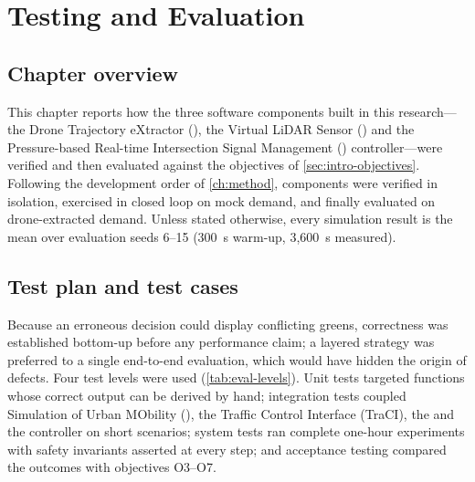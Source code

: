 \chapter{Testing and Evaluation}\label{ch:eval}

\section{Chapter overview}

This chapter reports how the three software components built in this research---the Drone Trajectory eXtractor (\dtx{}), the Virtual LiDAR Sensor (\vls{}) and the Pressure-based Real-time Intersection Signal Management (\prism{}) controller---were verified and then evaluated against the objectives of \cref{sec:intro-objectives}. Following the development order of \cref{ch:method}, components were verified in isolation, exercised in closed loop on mock demand, and finally evaluated on drone-extracted demand. Unless stated otherwise, every simulation result is the mean over evaluation seeds 6--15 (300~s warm-up, 3,600~s measured).

\section{Test plan and test cases}\label{sec:eval-plan}

Because an erroneous \prism{} decision could display conflicting greens, correctness was established bottom-up before any performance claim; a layered strategy was preferred to a single end-to-end evaluation, which would have hidden the origin of defects. Four test levels were used (\cref{tab:eval-levels}). Unit tests targeted functions whose correct output can be derived by hand; integration tests coupled Simulation of Urban MObility (\sumo{}), the Traffic Control Interface (TraCI), the \vls{} and the controller on short scenarios; system tests ran complete one-hour experiments with safety invariants asserted at every step; and acceptance testing compared the outcomes with objectives O3--O7.

